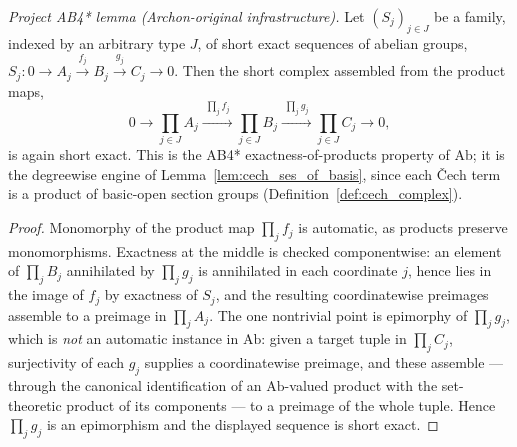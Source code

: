 \begin{lemma}
  \label{lem:short_exact_pi_map}
  \textit{Project AB4* lemma (Archon-original infrastructure).}
  Let \((S_j)_{j \in J}\) be a family, indexed by an arbitrary type \(J\), of short exact sequences
  of abelian groups, \(S_j : 0 \to A_j \xrightarrow{f_j} B_j \xrightarrow{g_j} C_j \to 0\). Then
  the short complex assembled from the product maps,
  \[
    0 \to \prod_{j \in J} A_j \xrightarrow{\;\prod_j f_j\;} \prod_{j \in J} B_j
      \xrightarrow{\;\prod_j g_j\;} \prod_{j \in J} C_j \to 0,
  \]
  is again short exact. This is the AB4* exactness-of-products property of \(\mathrm{Ab}\); it is
  the degreewise engine of Lemma~\ref{lem:cech_ses_of_basis}, since each {\v C}ech term is a product
  of basic-open section groups (Definition~\ref{def:cech_complex}).
\end{lemma}
\begin{proof}
  Monomorphy of the product map \(\prod_j f_j\) is automatic, as products preserve monomorphisms.
  Exactness at the middle is checked componentwise: an element of \(\prod_j B_j\) annihilated by
  \(\prod_j g_j\) is annihilated in each coordinate \(j\), hence lies in the image of \(f_j\) by
  exactness of \(S_j\), and the resulting coordinatewise preimages assemble to a preimage in
  \(\prod_j A_j\). The one nontrivial point is epimorphy of \(\prod_j g_j\), which is \emph{not} an
  automatic instance in \(\mathrm{Ab}\): given a target tuple in \(\prod_j C_j\), surjectivity of
  each \(g_j\) supplies a coordinatewise preimage, and these assemble — through the canonical
  identification of an \(\mathrm{Ab}\)-valued product with the set-theoretic product of its
  components — to a preimage of the whole tuple. Hence \(\prod_j g_j\) is an epimorphism and the
  displayed sequence is short exact.
\end{proof}

